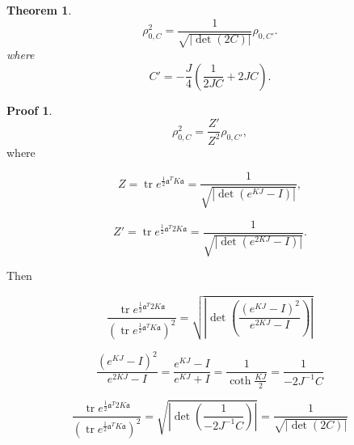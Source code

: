 \documentclass[12pt]{article}
\newtheorem{theorem}{Theorem}
\theoremstyle{definition}
\newtheorem*{demo}{Proof}
\begin{document}
	\begin{theorem}
		\begin{equation*}
			\rho_{0,C}^2 = \frac{1}{\sqrt{|\det(2 C)|}} \rho_{0,C'}.
		\end{equation*}
		where 
		\begin{equation*}
			C' = - \frac{J}{4}\left(\frac{1}{2 J C} + 2 J C\right).
		\end{equation*}
	\end{theorem}
	\begin{demo}
		\begin{equation*}
			\rho_{0,C}^2 = \frac{Z'}{Z^2}\rho_{0,C'},
		\end{equation*}
		where 
		
		\begin{equation*}
			Z = \operatorname{tr} e^{\frac12 \mathfrak{a}^T K  \mathfrak{a}}  = \frac{1}{\sqrt{|\det(e^{KJ} - I)|}},
		\end{equation*}
		
		\begin{equation*}
			Z' = \operatorname{tr} e^{\frac12 \mathfrak{a}^T 2K  \mathfrak{a}}  = \frac{1}{\sqrt{|\det(e^{2KJ} - I)|}}.
		\end{equation*}
		
		Then 
		
		\begin{equation*}
			\frac{\operatorname{tr} e^{\frac12 \mathfrak{a}^T 2K  \mathfrak{a}}  }{(\operatorname{tr} e^{\frac12 \mathfrak{a}^T K  \mathfrak{a}})^2} = \sqrt{\left|\det\left(\frac{(e^{KJ} - I)^2}{e^{2 KJ} - I}\right)\right|}
		\end{equation*}
		
		\begin{equation*}
			\frac{(e^{KJ} - I)^2}{e^{2 KJ} - I} = \frac{e^{KJ} - I}{e^{KJ} + I} = \frac{1}{\coth \frac{KJ}{2}} = \frac{1}{-2J^{-1} C}
		\end{equation*}
		
		\begin{equation*}
			\frac{\operatorname{tr} e^{\frac12 \mathfrak{a}^T 2K  \mathfrak{a}}  }{(\operatorname{tr} e^{\frac12 \mathfrak{a}^T K  \mathfrak{a}})^2} = \sqrt{\left|\det\left(\frac{1}{-2J^{-1} C}\right)\right|} = \frac{1}{\sqrt{|\det(2 C)|}}
		\end{equation*}
	\end{demo}
\end{document}
